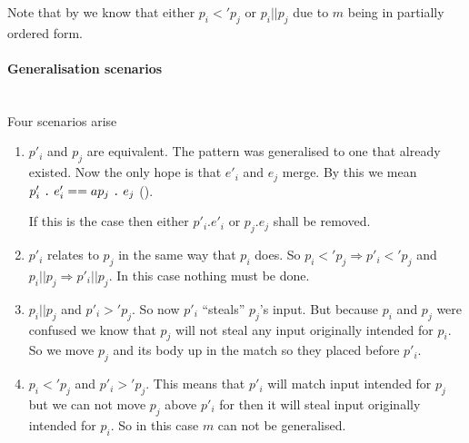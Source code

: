Note that by  we know that either $p_i <' p_j$ or $p_i ||
p_j$ due to $m$ being in partially ordered form.

\paragraph{Generalisation scenarios} \ \\
Four scenarios arise
\begin{enumerate}
\item $p'_i$ and $p_j$ are equivalent. The pattern was generalised to one that
  already existed. Now the only hope is that $e'_i$ and $e_j$ merge. By this we
  mean \mbox{$p'_i\mathrel{\texttt{.}}e'_i ==a p_j\mathrel{\texttt{.}}e_j$}
  ().

  If this is the case then either $p'_i \texttt{.} e'_i$ or $p_j \texttt{.} e_j$
  shall be removed. \label{item:gen-scen-1}
\item $p'_i$ relates to $p_j$ in the same way that $p_i$ does. So $p_i <' p_j
  \Rightarrow p'_i <' p_j$ and $p_i || p_j \Rightarrow p'_i || p_j$. In this
  case nothing must be done. \label{item:gen-scen-2}
\item $p_i || p_j$ and $p'_i >' p_j$. So now $p'_i$ ``steals'' $p_j$'s input. But
  because $p_i$ and $p_j$ were confused we know that $p_j$ will not steal any
  input originally intended for $p_i$. So we move $p_j$ and its body up in the
  match so they placed before $p'_i$. \label{item:gen-scen-3}
\item $p_i <' p_j$ and $p'_i >' p_j$. This means that $p'_i$ will match input
  intended for $p_j$ but we can not move $p_j$ above $p'_i$ for then it will
  steal input originally intended for $p_i$. So in this case $m$ can not be
  generalised. \label{item:gen-scen-4}
\end{enumerate}

